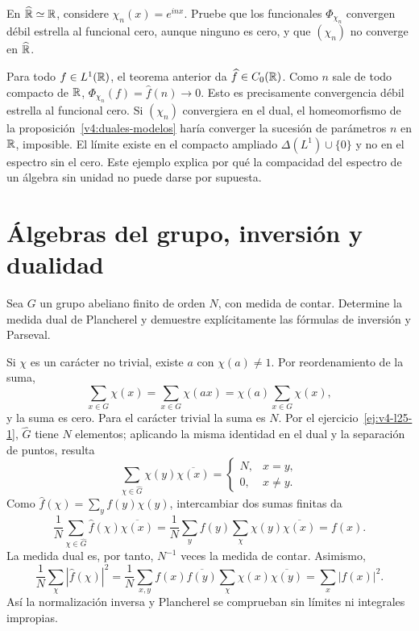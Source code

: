 \begin{ejercicio}\label{ej:v4-ampl-15-3}
En $\widehat{\mathbb R}\simeq\mathbb R$, considere $\chi_n(x)=e^{inx}$. Pruebe que los funcionales $\Phi_{\chi_n}$ convergen débil estrella al funcional cero, aunque ninguno es cero, y que $(\chi_n)$ no converge en $\widehat{\mathbb R}$.
\end{ejercicio}
\begin{solucion}
Para todo $f\in L^1(\mathbb R)$, el teorema anterior da $\widehat f\in C_0(\mathbb R)$. Como $n$ sale de todo compacto de $\mathbb R$, $\Phi_{\chi_n}(f)=\widehat f(n)\to0$. Esto es precisamente convergencia débil estrella al funcional cero. Si $(\chi_n)$ convergiera en el dual, el homeomorfismo de la proposición~\ref{v4:duales-modelos} haría converger la sucesión de parámetros $n$ en $\mathbb R$, imposible. El límite existe en el compacto ampliado $\Delta(L^1)\cup\{0\}$ y no en el espectro sin el cero. Este ejemplo explica por qué la compacidad del espectro de un álgebra sin unidad no puede darse por supuesta.
\end{solucion}

\chapter{Álgebras del grupo, inversión y dualidad}

\begin{ejercicio}\label{ej:v4-ampl-16-1}
Sea $G$ un grupo abeliano finito de orden $N$, con medida de contar. Determine la medida dual de Plancherel y demuestre explícitamente las fórmulas de inversión y Parseval.
\end{ejercicio}
\begin{solucion}
Si $\chi$ es un carácter no trivial, existe $a$ con $\chi(a)\ne1$. Por reordenamiento de la suma,
\[
 \sum_{x\in G}\chi(x)=\sum_{x\in G}\chi(ax)
 =\chi(a)\sum_{x\in G}\chi(x),
\]
y la suma es cero. Para el carácter trivial la suma es $N$. Por el ejercicio~\ref{ej:v4-l25-1}, $\widehat G$ tiene $N$ elementos; aplicando la misma identidad en el dual y la separación de puntos, resulta
\[
 \sum_{\chi\in\widehat G}\chi(y)\overline{\chi(x)}
 =\begin{cases}N,&x=y,\\0,&x\ne y.\end{cases}
\]
Como $\widehat f(\chi)=\sum_y f(y)\chi(y)$, intercambiar dos sumas finitas da
\[
 \frac1N\sum_{\chi\in\widehat G}\widehat f(\chi)\overline{\chi(x)}
 =\frac1N\sum_y f(y)\sum_\chi\chi(y)\overline{\chi(x)}=f(x).
\]
La medida dual es, por tanto, $N^{-1}$ veces la medida de contar. Asimismo,
\[
 \frac1N\sum_\chi|\widehat f(\chi)|^2
 =\frac1N\sum_{x,y}f(x)\overline{f(y)}
                   \sum_\chi\chi(x)\overline{\chi(y)}
 =\sum_x|f(x)|^2.
\]
Así la normalización inversa y Plancherel se comprueban sin límites ni integrales impropias.
\end{solucion}

